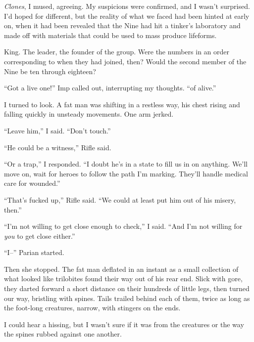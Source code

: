 \emph{Clones}, I mused, agreeing.  My suspicions were confirmed, and I wasn't surprised.  I'd hoped for different, but the reality of what we faced had been hinted at early on, when it had been revealed that the Nine had hit a tinker's laboratory and made off with materials that could be used to mass produce lifeforms.



King.  The leader, the founder of the group.  Were the numbers in an order corresponding to when they had joined, then?  Would the second member of the Nine be ten through eighteen?



``Got a live one!''  Imp called out, interrupting my thoughts.  ``\ldotsKind of alive.''



I turned to look.  A fat man was shifting in a restless way, his chest rising and falling quickly in unsteady movements.  One arm jerked.



``Leave him,'' I said.  ``Don't touch.''



``He could be a witness,'' Rifle said.



``Or a trap,'' I responded.  ``I doubt he's in a state to fill us in on anything.  We'll move on, wait for heroes to follow the path I'm marking.  They'll handle medical care for wounded.''



``That's fucked up,'' Rifle said.  ``We could at least put him out of his misery, then.''



``I'm not willing to get close enough to check,'' I said.  ``And I'm not willing for \emph{you} to get close either.''



``I--'' Parian started.



Then she stopped.  The fat man deflated in an instant as a small collection of what looked like trilobites found their way out of his rear end.  Slick with gore, they darted forward a short distance on their hundreds of little legs, then turned our way, bristling with spines.  Tails trailed behind each of them, twice as long as the foot-long creatures, narrow, with stingers on the ends.



I could hear a hissing, but I wasn't sure if it was from the creatures or the way the spines rubbed against one another.




